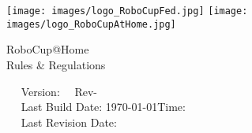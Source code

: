 \begin{titlepage}
  \begin{center}
    {
      \texttt{[image: images/logo\_RoboCupFed.jpg]}
      \hfill
      \texttt{[image: images/logo\_RoboCupAtHome.jpg]}\\[1.23ex]
    }
    \vspace{2.7 cm}
    \hrulefill\par
    {%
      \vspace*{.27cm}
      \Huge{RoboCup@Home}\\[1.23ex]
      \Large Rules \& Regulations \\[2ex]
    }
    \hrulefill\par
    \vfill
    ~~ Version: \YEAR ~~Rev-\svnRevision ~~ \\
    ~~ Last Build Date: \today \quad Time: \the\time ~~ \\
    ~~ Last Revision Date: \svnChangeData ~~ %
  \end{center}
\end{titlepage}
